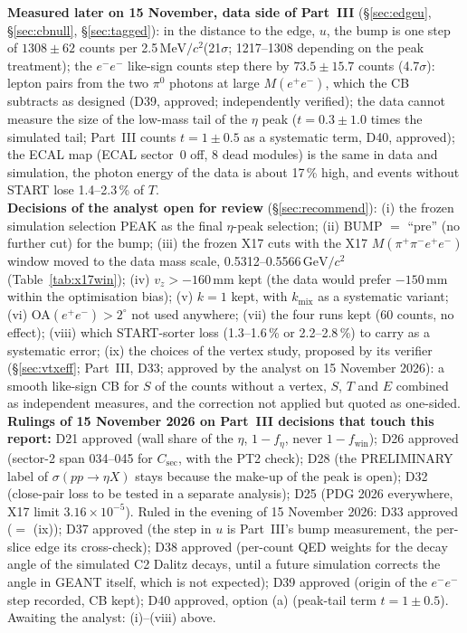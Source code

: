 \documentclass[11pt,a4paper]{article}
\newcommand{\piz}{\ensuremath{\pi^{0}}\xspace}
\newcommand{\ee}{\ensuremath{e^{+}e^{-}}\xspace}
\newcommand{\Mfour}{\ensuremath{M(\pi^{+}\pi^{-}e^{+}e^{-})}\xspace}
\newcommand{\Mee}{\ensuremath{M(e^{+}e^{-})}\xspace}
\newcommand{\GeVcc}{\ensuremath{\mathrm{GeV}/c^{2}}\xspace}
\newcommand{\MeVcc}{\ensuremath{\mathrm{MeV}/c^{2}}\xspace}
\newcommand{\code}[1]{\texttt{\detokenize{#1}}}
\newcommand{\vz}{\ensuremath{v_z}\xspace}
\newcommand{\fwin}{\ensuremath{f_{\mathrm{win}}}\xspace}
\newcommand{\notebox}[1]{\par\noindent\colorbox{orange!10}{\parbox{\dimexpr\linewidth-2\fboxsep\relax}{#1}}\par}
\begin{document}
\notebox{\textbf{Measured later on 15 November, data side of Part~III} (\S\ref{sec:edgeu}, \S\ref{sec:cbnull}, \S\ref{sec:tagged}): in the distance to
the edge, $u$, the bump is one step of $1308\pm62$ counts per 2.5\,\MeVcc (21$\sigma$; 1217--1308 depending on the peak treatment); the
$e^-e^-$ like-sign counts step there by $73.5\pm15.7$ counts (4.7$\sigma$): lepton pairs from the two \piz photons at large \Mee, which the CB
subtracts as designed (D39, approved; independently verified); the data cannot measure the size of the low-mass tail of the $\eta$ peak
($t=0.3\pm1.0$ times the simulated tail; Part~III counts $t=1\pm0.5$ as a systematic term, D40, approved); the ECAL map (ECAL sector~0 off, 8 dead
modules) is the same in data and simulation, the photon energy of the data is about 17\,\% high, and events without START lose 1.4--2.3\,\% of
$T$.\\[0.3em]
\textbf{Decisions of the analyst open for review} (\S\ref{sec:recommend}):
(i) the frozen simulation selection PEAK as the final $\eta$-peak selection;
(ii) BUMP $=$ ``pre'' (no further cut) for the bump;
(iii) the frozen X17 cuts with the X17 \Mfour window moved to the data mass scale, 0.5312--0.5566\,\GeVcc (Table~\ref{tab:x17win});
(iv) $\vz>-160$\,mm kept (the data would prefer $-150$\,mm within the optimisation bias);
(v) $k=1$ kept, with $k_{\mathrm{mix}}$ as a systematic variant;
(vi) OA$(\ee)>2^\circ$ not used anywhere;
(vii) the four \code{no_hf} runs kept (60 counts, no effect);
(viii) which START-sorter loss (1.3--1.6\,\% or 2.2--2.8\,\%) to carry as a systematic error;
(ix) the choices of the vertex study, proposed by its verifier (\S\ref{sec:vtxeff}; Part~III, D33; approved by the analyst on 15 November 2026): a smooth like-sign CB for $S$ of the counts
without a vertex, $S$, $T$ and $E$ combined as independent measures, and the correction not applied but quoted as one-sided.\\[0.3em]
\textbf{Rulings of 15 November 2026 on Part~III decisions that touch this report:} D21 approved (wall share of the $\eta$, $1-f_\eta$, never
$1-\fwin$); D26 approved (sector-2 span 034--045 for $C_{\mathrm{sec}}$, with the PT2 check); D28 (the PRELIMINARY label of
$\sigma(pp\to\eta X)$ stays because the make-up of the peak is open); D32 (close-pair loss to be tested in a separate analysis); D25 (PDG
2026 everywhere, X17 limit $3.16\times10^{-5}$). Ruled in the evening of 15 November 2026: D33 approved ($=$ (ix)); D37 approved (the step in
$u$ is Part~III's bump measurement, the per-slice edge its cross-check); D38 approved (per-count QED weights for the decay angle of the
simulated C2 Dalitz decays, until a future simulation corrects the angle in GEANT itself, which is not expected); D39 approved (origin of the
$e^-e^-$ step recorded, CB kept); D40 approved, option (a) (peak-tail term $t=1\pm0.5$). Awaiting the analyst: (i)--(viii) above.}
\end{document}
